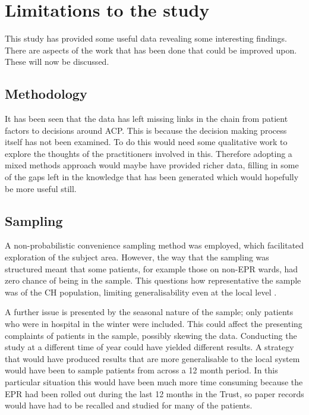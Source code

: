 \documentclass
[
	12pt,
	a4paper,
	oneside,
]{report}
\begin{document}
\section{Limitations to the study}

This study has provided some useful data revealing some interesting findings.
There are aspects of the work that has been done
that could be improved upon. These will now be discussed.

\subsection{Methodology}

It has been seen that the data has left missing links in the 
chain from patient factors to decisions around ACP. This is because the
decision making process itself has not been examined. To do this would need 
some qualitative work to explore the thoughts of the practitioners involved
in this. Therefore adopting a mixed methods approach 
would maybe have provided richer data, filling in some of the gaps left in the
knowledge that has been generated which would hopefully be more useful still.

\subsection{Sampling}
A non-probabilistic convenience sampling method was employed, which facilitated 
exploration of the subject area. However, the way that the sampling was 
structured meant that some patients, for example those on non-EPR wards, had
zero chance of being in the sample. This questions how representative the sample
was of the CH population, limiting generalisability even at the local level 
\parencite{biggam:15}.

A further issue is presented by the seasonal 
nature of the sample; only patients who were in hospital in the winter were 
included. This could affect the presenting complaints of patients in the sample,
possibly skewing the data.
Conducting the study at a different time of year could have yielded different 
results. A strategy that would have produced results that are more generalisable
to the local system would have been to sample patients from across
a 12 month period. In this particular situation this would have been much more
time consuming because the EPR had been rolled out during the last 12 months in
the Trust, so paper records would have had to be recalled and studied for many
of the patients. 
\end{document}
